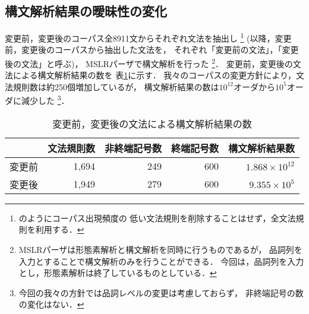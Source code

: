 \subsection{構文解析結果の曖昧性の変化}

変更前，変更後のコーパス全8911文からそれぞれ文法を抽出し
\footnote{\cite{charniak:96}のようにコーパス出現頻度の
低い文法規則を削除することはせず，全文法規則を利用する．}
(以降，変更前，変更後のコーパスから抽出した文法を，
それぞれ「変更前の文法」，「変更後の文法」と呼ぶ)，
MSLRパーザで構文解析を行った
\footnote{MSLRパーザは形態素解析と構文解析を同時に行うものであるが，
品詞列を入力とすることで構文解析のみを行うことができる．
今回は，品詞列を入力とし，形態素解析は終了しているものとしている．}．
変更前，変更後の文法による構文解析結果の数を
表\ref{tab:result_ambiguity}に示す．
我々のコーパスの変更方針により，文法規則数は約250個増加しているが，
構文解析結果の数は$10^{12}$オーダから$10^5$オーダに減少した
\footnote{今回の我々の方針では品詞レベルの変更は考慮しておらず，
非終端記号の数の変化はない．}．

\begin{table}[tp]
  \centering
  \caption{変更前，変更後の文法による構文解析結果の数}
  \label{tab:result_ambiguity}
  \begin{tabular}{|c|r|r|r|r|}\hline
    & \multicolumn{1}{|c|}{文法規則数}
    & \multicolumn{1}{|c|}{非終端記号数}
    & \multicolumn{1}{|c|}{終端記号数}
    & \multicolumn{1}{|c|}{構文解析結果数} \\\hline
    変更前 & 1,694 & 249 & 600 & $1.868 \times 10^{12}$ \\\hline
    変更後 & 1,949 & 279 & 600 & $9.355 \times 10^5$ \\\hline
  \end{tabular}
\end{table}

